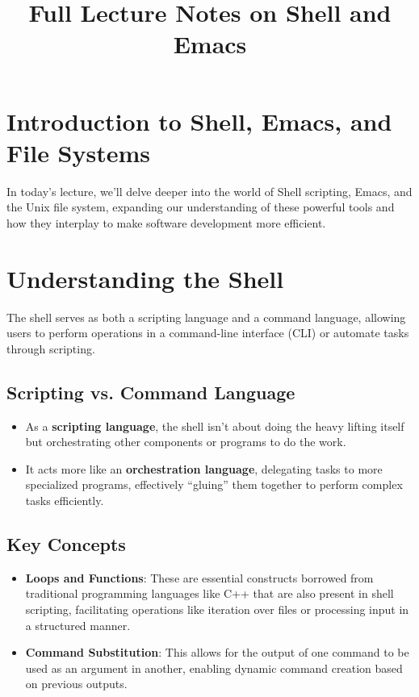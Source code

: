\documentclass{article}
\title{Full Lecture Notes on Shell and Emacs}
\author{}
\date{}
\begin{document}
\maketitle

\tableofcontents

\section{Introduction to Shell, Emacs, and File Systems}

In today's lecture, we'll delve deeper into the world of Shell scripting, Emacs, and the Unix file system, expanding our understanding of these powerful tools and how they interplay to make software development more efficient.

\section{Understanding the Shell}

The shell serves as both a scripting language and a command language, allowing users to perform operations in a command-line interface (CLI) or automate tasks through scripting.

\subsection{Scripting vs. Command Language}

\begin{itemize}
    \item As a \textbf{scripting language}, the shell isn't about doing the heavy lifting itself but orchestrating other components or programs to do the work.
    \item It acts more like an \textbf{orchestration language}, delegating tasks to more specialized programs, effectively ``gluing'' them together to perform complex tasks efficiently.
\end{itemize}

\subsection{Key Concepts}

\begin{itemize}
    \item \textbf{Loops and Functions}: These are essential constructs borrowed from traditional programming languages like C++ that are also present in shell scripting, facilitating operations like iteration over files or processing input in a structured manner.
    \item \textbf{Command Substitution}: This allows for the output of one command to be used as an argument in another, enabling dynamic command creation based on previous outputs.
\end{itemize}
\end{document}
